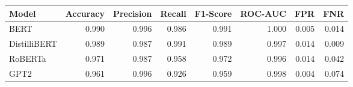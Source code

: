 \begin{tabular}{|l||r|r|r|r|r|r|r|}
\toprule
Model & \textbf{Accuracy} & \textbf{Precision} & Recall & \textbf{F1-Score} & \textbf{ROC-AUC} & \textbf{FPR} & FNR \\
\midrule \midrule
BERT & 0.990 & 0.996 & 0.986 & 0.991 & 1.000 & 0.005 & 0.014 \\
DistilliBERT & 0.989 & 0.987 & 0.991 & 0.989 & 0.997 & 0.014 & 0.009 \\
RoBERTa & 0.971 & 0.987 & 0.958 & 0.972 & 0.996 & 0.014 & 0.042 \\
GPT2 & 0.961 & 0.996 & 0.926 & 0.959 & 0.998 & 0.004 & 0.074 \\
\bottomrule
\end{tabular}
